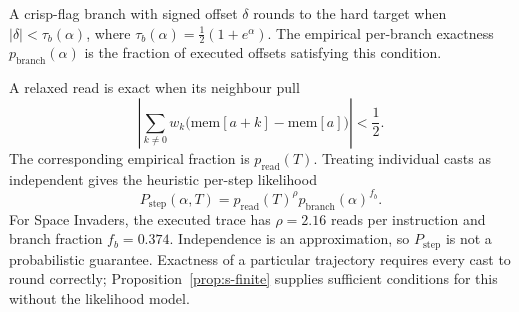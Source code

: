 \documentclass[letterpaper]{article} %
\begin{document}
A crisp-flag branch with signed offset $\delta$
rounds to the hard target when
$|\delta|<\tau_b(\alpha)$, where
$\tau_b(\alpha)=\tfrac12(1+e^\alpha)$.
The empirical per-branch exactness
$p_{\mathrm{branch}}(\alpha)$ is the fraction of
executed offsets satisfying this condition.

A relaxed read is exact when its neighbour pull
\begin{equation}
\left|\sum_{k\ne0}
w_k\big(\mathrm{mem}[a+k]-\mathrm{mem}[a]\big)\right|
<\frac12 .
\end{equation}
The corresponding empirical fraction is
$p_{\mathrm{read}}(T)$. Treating individual casts
as independent gives the heuristic per-step
likelihood
\begin{equation}
P_{\mathrm{step}}(\alpha,T)
=p_{\mathrm{read}}(T)^\rho
p_{\mathrm{branch}}(\alpha)^{f_b}.
\label{eq:s-castlikelihood}
\end{equation}
For Space Invaders, the executed trace has
$\rho=2.16$ reads per instruction and branch
fraction $f_b=0.374$. Independence is an
approximation, so $P_{\mathrm{step}}$ is not a
probabilistic guarantee. Exactness of a particular
trajectory requires every cast to round correctly;
Proposition~\ref{prop:s-finite} supplies sufficient
conditions for this without the likelihood model.
\end{document}
